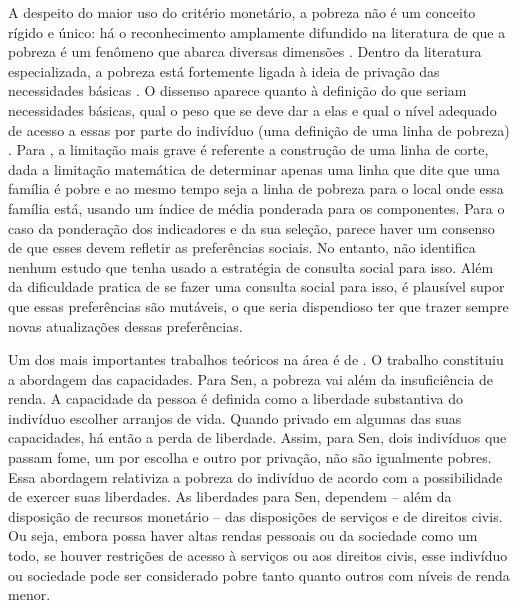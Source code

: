 \documentclass[
	12pt,				%
	openright,			%
	twoside,			%
	a4paper,			%
	english,			%
	french,				%
	spanish,			%
	brazil				%
	]{abntex2}
\begin{document}
A despeito do maior uso do critério monetário, a pobreza não é um conceito rígido e único: há o reconhecimento amplamente difundido na literatura de que a pobreza é um fenômeno que abarca diversas dimensões \cite{barros2006pobreza}. Dentro da literatura especializada, a pobreza está fortemente ligada à ideia de privação das necessidades básicas \cite{rocha2003pobreza, medeiros2012medidas}. O dissenso aparece quanto à definição do que seriam necessidades básicas, qual o peso que se deve dar a elas e qual o nível adequado de acesso a essas por parte do indivíduo (uma definição de uma linha de pobreza) \cite{rocha2003pobreza, barros2006pobreza, kageyama2006pobreza, soares2009metodologias}. Para , a limitação mais grave é referente a construção de uma linha de corte, dada a limitação matemática de determinar apenas uma linha que dite que uma família é pobre e ao mesmo tempo seja a linha de pobreza para o local onde essa família está, usando um índice de média ponderada para os componentes. Para o caso da ponderação dos indicadores e da sua seleção, parece haver um consenso de que esses devem refletir as preferências sociais. No entanto,  não identifica nenhum estudo que tenha usado a estratégia de consulta social para isso. Além da dificuldade pratica de se fazer uma consulta social para isso, é plausível supor que essas preferências são mutáveis, o que seria dispendioso ter que trazer sempre novas atualizações dessas preferências.

Um dos mais importantes trabalhos teóricos na área é de \cite{sen1983poor}. O trabalho constituiu a abordagem das capacidades. Para Sen, a pobreza vai além da insuficiência de renda. A capacidade da pessoa é definida como a liberdade substantiva do indivíduo escolher arranjos de vida. Quando privado em algumas das suas capacidades, há então a perda de liberdade. Assim, para Sen, dois indivíduos que passam fome, um por escolha e outro por privação, não são igualmente pobres. Essa abordagem relativiza a pobreza do indivíduo de acordo com a possibilidade de exercer suas liberdades. As liberdades para Sen, dependem -- além da disposição de recursos monetário -- das disposições de serviços e de direitos civis. Ou seja, embora possa haver altas rendas pessoais ou da sociedade como um todo, se houver restrições de acesso à serviços ou aos direitos civis, esse indivíduo ou sociedade pode ser considerado pobre tanto quanto outros com níveis de renda menor. 
\end{document}
